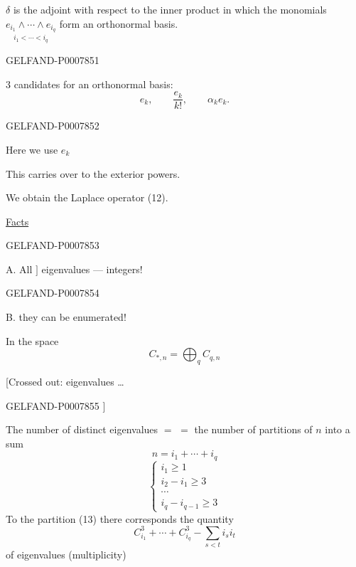 \(\delta\) is the adjoint with respect to the inner product in which the monomials
\(\underset{i_1<\cdots<i_q}{e_{i_1}\wedge\cdots\wedge e_{i_q}}\)
form an orthonormal basis.


\begin{GelfandAdjacentEvidence}{GELFAND-P000785}{1}

3 candidates for an orthonormal basis:
\[
e_k,\qquad\frac{e_k}{k!},\qquad\alpha_ke_k.
\]
\end{GelfandAdjacentEvidence}
\begin{GelfandAdjacentEvidence}{GELFAND-P000785}{2}

Here we use \(e_k\)

This carries over to the exterior powers.

We obtain the Laplace operator (12).

\underline{Facts}
\end{GelfandAdjacentEvidence}
\begin{GelfandAdjacentEvidence}{GELFAND-P000785}{3}


A. All \(\big]\) eigenvalues --- integers!
\end{GelfandAdjacentEvidence}
\begin{GelfandAdjacentEvidence}{GELFAND-P000785}{4}


B. they can be enumerated!

In the space
\[
C_{*,n}=\bigoplus_q C_{q,n}
\]

[Crossed out: eigenvalues …
\end{GelfandAdjacentEvidence}
\begin{GelfandAdjacentEvidence}{GELFAND-P000785}{5}
]

The number of distinct eigenvalues \(=\)
\newline
\(=\) the number of partitions of \(n\) into a sum
\begin{equation}
n=i_1+\cdots+i_q\tag{13}
\end{equation}
\begin{equation}
\begin{cases}
i_1\geq1\\
i_2-i_1\geq3\\
\cdots\\
i_q-i_{q-1}\geq3
\end{cases}\tag{14}
\end{equation}
To the partition (13) there corresponds the quantity
\begin{equation}
C_{i_1}^3+\cdots+C_{i_q}^3-\sum_{s<t}i_si_t\tag{15}
\end{equation}
of eigenvalues (multiplicity)
\end{GelfandAdjacentEvidence}
